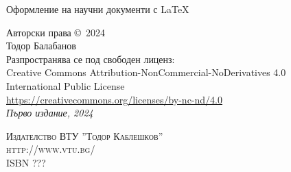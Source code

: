 \noindent Оформление на научни документи с LaTeX

\noindent Авторски права \copyright\ 2024 \\

\noindent Тодор Балабанов \\ 

\noindent Разпространява се под свободен лиценз: \\ 
Creative Commons Attribution-NonCommercial-NoDerivatives 4.0 \\
International Public License \\
\url{https://creativecommons.org/licenses/by-nc-nd/4.0} \\

\noindent \textit{Първо издание, 2024}

\noindent \textsc{Издателство ВТУ ''Тодор Каблешков''} \\
\noindent \textsc{http://www.vtu.bg/} \\

ISBN ???
